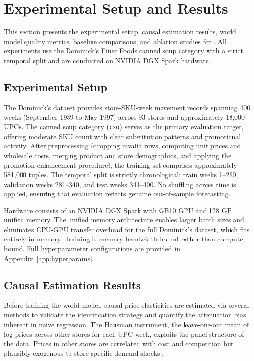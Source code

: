 \section{Experimental Setup and Results}
\label{sec:results}

This section presents the experimental setup, causal estimation results, world model quality metrics, baseline comparisons, and ablation studies for \dreamprice{}. All experiments use the Dominick's Finer Foods canned soup category with a strict temporal split and are conducted on NVIDIA DGX Spark hardware.

\subsection{Experimental Setup}

The Dominick's dataset \citep{dominicks1999} provides store-SKU-week movement records spanning 400 weeks (September 1989 to May 1997) across 93 stores and approximately 18,000 UPCs. The canned soup category (\texttt{cso}) serves as the primary evaluation target, offering moderate SKU count with clear substitution patterns and promotional activity. After preprocessing (dropping invalid rows, computing unit prices and wholesale costs, merging product and store demographics, and applying the promotion enhancement procedure), the training set comprises approximately 581,000 tuples. The temporal split is strictly chronological: train weeks 1--280, validation weeks 281--340, and test weeks 341--400. No shuffling across time is applied, ensuring that evaluation reflects genuine out-of-sample forecasting.

Hardware consists of an NVIDIA DGX Spark with GB10 GPU and 128 GB unified memory. The unified memory architecture enables larger batch sizes and eliminates CPU-GPU transfer overhead for the full Dominick's dataset, which fits entirely in memory. Training is memory-bandwidth bound rather than compute-bound. Full hyperparameter configurations are provided in Appendix~\ref{app:hyperparams}.

\subsection{Causal Estimation Results}

Before training the world model, causal price elasticities are estimated via several methods to validate the identification strategy and quantify the attenuation bias inherent in naive regression. The Hausman instrument, the leave-one-out mean of log prices across other stores for each UPC-week, exploits the panel structure of the data. Prices in other stores are correlated with cost and competition but plausibly exogenous to store-specific demand shocks \citep{hausman1978specification}.

